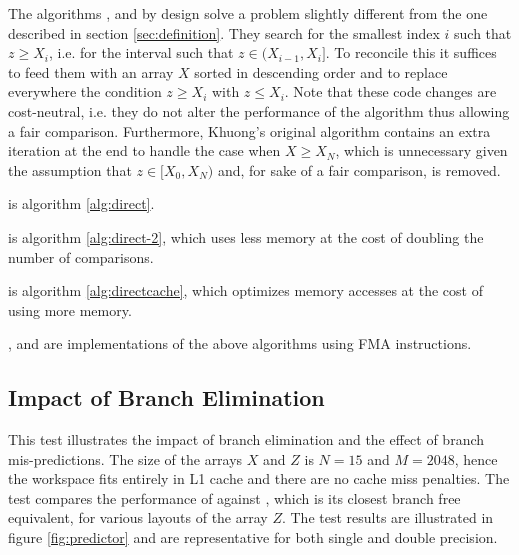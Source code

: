 \documentclass[preprint,1p,times]{elsarticle}
\newcounter{subsubsubsection}[subsubsection]
\begin{document}
The algorithms \textit{\MorinBranchyName}, \textit{\LowerBoundName} and \textit{\MorinOffsetName} by design solve a problem slightly different from the one described in section \ref{sec:definition}. They search for the smallest index $i$ such that $z \geq X_i$, i.e. for the interval such that $z \in (X_{i-1},X_i]$. To reconcile this it suffices to feed them with an array $X$ sorted in descending order and to replace everywhere the condition $z \geq X_i$ with $z \leq X_i$. Note that these code changes are cost-neutral, i.e. they do not alter the performance of the algorithm thus allowing a fair comparison. Furthermore, Khuong's original algorithm contains an extra iteration at the end to handle the case when $X \geq X_N$, which is unnecessary given the assumption that $z \in [X_0,X_N)$ and, for sake of a fair comparison, is removed.

	\begin{myitemize}
		\item \textit{\DirectName} is algorithm \ref{alg:direct}.
		\item \textit{\DirectGapName} is algorithm \ref{alg:direct-2}, which uses less memory at the cost of doubling the number of comparisons.
		\item \textit{\DirectCacheName} is algorithm \ref{alg:directcache}, which optimizes memory accesses at the cost of using more memory.
		\item \textit{\DirectFMAName}, \textit{\DirectGapFMAName} and \textit{\DirectCacheFMAName} are implementations of the above algorithms using FMA instructions.
	\end{myitemize}



\subsection{Impact of Branch Elimination}
\label{sec:testpredict}
This test illustrates the impact of branch elimination and the effect of branch mis-predictions.
The size of the arrays $X$ and $Z$ is $N=15$ and $M=2048$, hence the workspace fits entirely in L1 cache and there are no cache miss penalties. The test compares the performance of \textit{\ClassicName} against \textit{\ClassicModName}, which is its closest branch free equivalent, for various layouts of the array $Z$. The test results are illustrated in figure \ref{fig:predictor} and are representative for both single and double precision.
\end{document}
